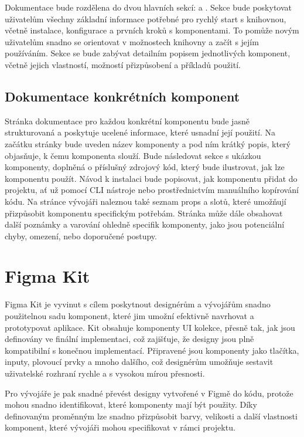 Dokumentace bude rozdělena do dvou hlavních sekcí:  a . Sekce  bude poskytovat uživatelům všechny základní informace potřebné pro rychlý start s knihovnou, včetně instalace, konfigurace a prvních kroků s komponentami. To pomůže novým uživatelům snadno se orientovat v možnostech knihovny a začít s jejím používáním. Sekce  se bude zabývat detailním popisem jednotlivých komponent, včetně jejich vlastností, možností přizpůsobení a příkladů použití.

\subsection{Dokumentace konkrétních komponent}
Stránka dokumentace pro každou konkrétní komponentu bude jasně strukturovaná a poskytuje ucelené informace, které usnadní její použití. Na začátku stránky bude uveden název komponenty a pod ním krátký popis, který objasňuje, k čemu komponenta slouží. Bude následovat sekce s ukázkou komponenty, doplněná o příslušný zdrojový kód, který bude ilustrovat, jak lze komponentu použít. Návod k instalaci bude popisovat, jak komponentu přidat do projektu, ať už pomocí CLI nástroje nebo prostřednictvím manuálního kopírování kódu. Na stránce vývojáři naleznou také seznam props a slotů, které umožňují přizpůsobit komponentu specifickým potřebám. Stránka může dále obsahovat další poznámky a varování ohledně specifik komponenty, jako jsou potenciální chyby, omezení, nebo doporučené postupy.

\section{Figma Kit}
Figma Kit je vyvinut s cílem poskytnout designérům a vývojářům snadno použitelnou sadu komponent, které jim umožní efektivně navrhovat a prototypovat aplikace. Kit obsahuje komponenty UI kolekce, přesně tak, jak jsou definovány ve finální implementaci, což zajišťuje, že designy jsou plně kompatibilní s konečnou implementací. Připravené jsou komponenty jako tlačítka, inputy, plovoucí prvky a mnoho dalšího, což designérům umožňuje sestavit uživatelské rozhraní rychle a s vysokou mírou přesnosti.

Pro vývojáře je pak snadné převést designy vytvořené v Figmě do kódu, protože mohou snadno identifikovat, které komponenty mají být použity. Díky definovaným proměnným lze snadno přizpůsobit barvy, velikosti a další vlastnosti komponent, které vývojáři mohou specifikovat v rámci projektu.


